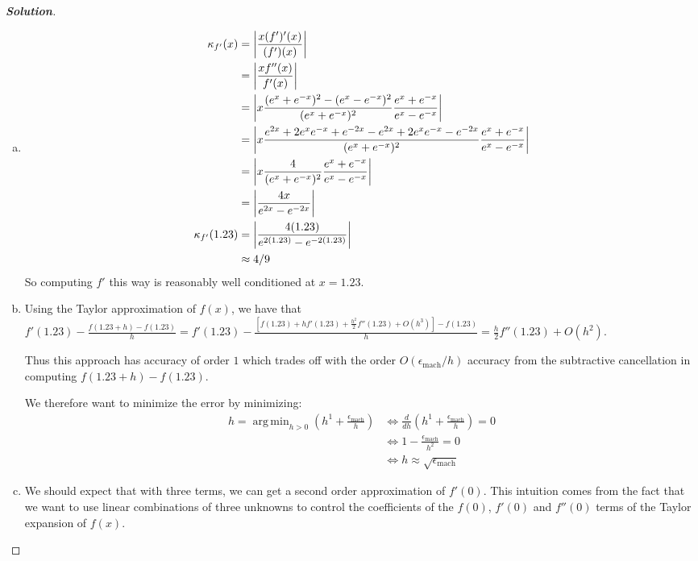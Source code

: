 \documentclass[11pt]{article}
\DeclareMathOperator*{\argmin}{arg\,min}
\DeclarePairedDelimiter{\abs}{\lvert}{\rvert}
\newenvironment{solution}{%
  \begin{proof}[\textbf{Solution}]$ $\par\nobreak\ignorespaces
}{%
  \end{proof}
}
\theoremstyle{definition}
\begin{document}
\begin{solution}
\begin{enumerate}[(a)]
\item
\begin{align*}
    \kappa_{f'}(x) &= \abs*{\frac{x(f')'(x)}{(f')(x)}} \\
    &= \abs*{\frac{x f''(x)}{f'(x)}} \\
    &= \abs*{x \frac{(e^x + e^{-x})^2 - (e^x - e^{-x})^2}{(e^x + e^{-x})^2} \frac{e^x + e^{-x}}{e^{x} - e^{-x}}} \\
    &= \abs*{x \frac{e^{2x} + 2e^x e^{-x} + e^{-2x} - e^{2x} + 2e^x e^{-x} - e^{-2x}}{(e^x + e^{-x})^2} \frac{e^x + e^{-x}}{e^{x} - e^{-x}}} \\
    &= \abs*{x \frac{4}{(e^x + e^{-x})^2} \frac{e^x + e^{-x}}{e^{x} - e^{-x}}} \\
    &= \abs*{\frac{4x}{e^{2x} - e^{-2x}}} \\
    \kappa_{f'}(1.23) &= \abs*{\frac{4(1.23)}{e^{2(1.23)} - e^{-2(1.23)}}} \\
    &\approx 4/9
\end{align*}
So computing $f'$ this way is reasonably well conditioned at $x = 1.23$.
\item
Using the Taylor approximation of $f(x)$, we have that $f'(1.23) - \frac{f(1.23 + h) - f(1.23)}{h} = f'(1.23) - \frac{[f(1.23) + hf'(1.23) + \frac{h^2}{2}f''(1.23) + O(h^3)] - f(1.23)}{h} = \frac{h}{2}f''(1.23) + O(h^2)$.

Thus this approach has accuracy of order $1$ which trades off with the order $O(\epsilon_{\text{mach}}/h)$ accuracy from the subtractive cancellation in computing $f(1.23 + h) - f(1.23)$.

We therefore want to minimize the error by minimizing:
\begin{align*}
     h = \argmin_{h > 0} (h^{1} + \frac{\epsilon_{\text{mach}}}{h}) &\Leftrightarrow \frac{d}{dh} (h^{1} + \frac{\epsilon_{\text{mach}}}{h}) = 0 \\
     &\Leftrightarrow 1 - \frac{\epsilon_{\text{mach}}}{h^2} = 0 \\
     &\Leftrightarrow h \approx \sqrt{\epsilon_{\text{mach}}}
\end{align*}
\item
We should expect that with three terms, we can get a second order approximation of $f'(0)$. This intuition comes from the fact that we want to use linear combinations of three unknowns to control the coefficients of the $f(0)$, $f'(0)$ and $f''(0)$ terms of the Taylor expansion of $f(x)$.


\end{enumerate}
\end{solution}
\end{document}
